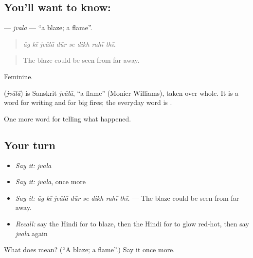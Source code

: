 \subsection*{You'll want to know: }
\textbf{} — \emph{jvālā} — \textquotedblleft{}a blaze; a flame\textquotedblright{}.

\begin{quote}
       
\end{quote}

\begin{quote}
\emph{āg kī jvālā dūr se dikh rahī thī.}
\end{quote}

\begin{quote}
The blaze could be seen from far away.
\end{quote}

Feminine.

\begin{cousinweb}
\textbf{} (\emph{jvālā}) is Sanskrit \emph{jvālā}, \textquotedblleft{}a flame\textquotedblright{} (Monier-Williams), taken over whole. It is a word for writing and for big fires; the everyday word is \textbf{}.
\end{cousinweb}

\begin{grammarlens}[title={What you've built}]
One more word for telling what happened.
\end{grammarlens}

\subsection*{Your turn}
\begin{itemize}
\raggedright
  \item \emph{Say it:} \emph{jvālā}
  \item \emph{Say it:} \emph{jvālā}, once more
  \item \emph{Say it:} \emph{āg kī jvālā dūr se dikh rahī thī.} — The blaze could be seen from far away.
  \item \emph{Recall:} say the Hindi for to blaze, then the Hindi for to glow red-hot, then say \emph{jvālā} again
\end{itemize}

\begin{tcolorbox}[breakable,colback=teal!4,colframe=teal!35!black,title={Before you move on}]
What does  mean? (\textquotedblleft{}A blaze; a flame\textquotedblright{}.) Say it once more.
\end{tcolorbox}
